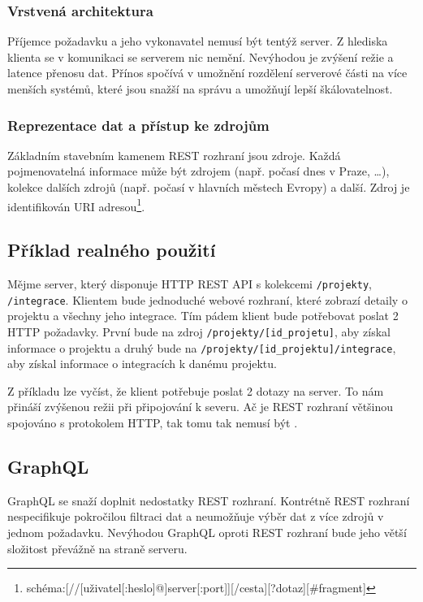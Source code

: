 \subsubsection{Vrstvená architektura}

Příjemce požadavku a jeho vykonavatel nemusí být tentýž server.
Z hlediska klienta se v komunikaci se serverem nic nemění.
Nevýhodou je zvýšení režie a latence přenosu dat.
Přínos spočívá v umožnění rozdělení serverové části na více menších systémů, které jsou snažší na správu a umožňují lepší škálovatelnost.
\cite{rest_architektura}

\subsubsection{Reprezentace dat a přístup ke zdrojům}

Základním stavebním kamenem REST rozhraní jsou zdroje.
Každá pojmenovatelná informace může být zdrojem (např. počasí dnes v Praze, \ldots), kolekce dalších zdrojů (např. počasí v hlavních městech Evropy) a další.
Zdroj je identifikován URI adresou\footnote{schéma:[//[uživatel[:heslo]@]server[:port]][/cesta][?dotaz][\#fragment]}.
\cite{rest_zdroje}

\subsection{Příklad realného použití}

Mějme server, který disponuje HTTP REST API s kolekcemi \verb|/projekty|, \verb|/integrace|.
Klientem bude jednoduché webové rozhraní, které zobrazí detaily o projektu a všechny jeho integrace.
Tím pádem klient bude potřebovat poslat 2 HTTP požadavky.
První bude na zdroj \verb|/projekty/[id_projetu]|, aby získal informace o projektu a druhý bude na \verb|/projekty/[id_projektu]/integrace|, aby získal informace o integracích k danému projektu.

Z příkladu lze vyčíst, že klient potřebuje poslat 2 dotazy na server.
To nám přináší zvýšenou režii při připojování k severu.
Ač je REST rozhraní většinou spojováno s protokolem HTTP, tak tomu tak nemusí být \cite{rest_http}.

\subsection{GraphQL}

GraphQL se snaží doplnit nedostatky REST rozhraní.
Kontrétně REST rozhraní nespecifikuje pokročilou filtraci dat a neumožňuje výběr dat z více zdrojů v jednom požadavku.
Nevýhodou GraphQL oproti REST rozhraní bude jeho větší složitost převážně na straně serveru.
\cite{graphql}

